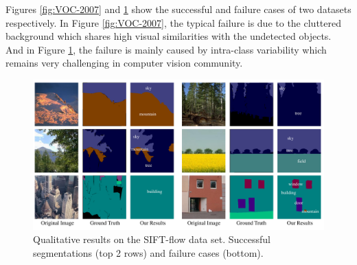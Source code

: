Figures \ref{fig:VOC-2007} and \ref{fig:SIFT-flow} show the successful and failure cases of two datasets respectively. In Figure \ref{fig:VOC-2007}, the typical failure is due to the cluttered background which shares high visual similarities with the undetected objects. And in Figure \ref{fig:SIFT-flow}, the failure is mainly caused by intra-class variability which remains very challenging in computer vision community.

\begin{figure}
\begin{center}
    \includegraphics[width=0.9\linewidth]{Fig_SIFTflow.pdf}
\end{center}
\vspace{-5mm}
\caption{Qualitative results on the SIFT-flow data set. Successful segmentations (top 2 rows) and failure cases (bottom).}
\label{fig:SIFT-flow}
\end{figure}


